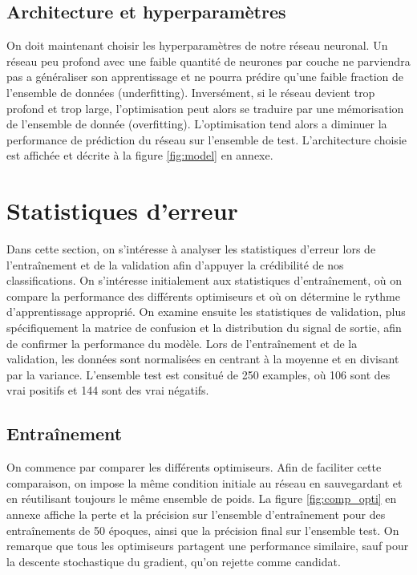 \documentclass{article}
\begin{document}
\subsection{Architecture et hyperparamètres}

On doit maintenant choisir les hyperparamètres de notre réseau neuronal. Un réseau peu profond avec une faible quantité de neurones par couche ne parviendra pas a généraliser son apprentissage et ne pourra prédire qu'une faible fraction de l'ensemble de données (underfitting). Inversément, si le réseau devient trop profond et trop large, l'optimisation peut alors se traduire par une mémorisation de l'ensemble de donnée (overfitting). L'optimisation tend alors a diminuer la performance de prédiction du réseau sur l'ensemble de test. L'architecture choisie est affichée et décrite à la figure \ref{fig:model} en annexe.

\section{Statistiques d'erreur}\label{sec:stat_err}

Dans cette section, on s'intéresse à analyser les statistiques d'erreur lors de l'entraînement et de la validation afin d'appuyer la crédibilité de nos classifications. On s'intéresse initialement aux statistiques d'entraînement, où on compare la performance des différents optimiseurs et où on détermine le rythme d'apprentissage approprié. On examine ensuite les statistiques de validation, plus spécifiquement la matrice de confusion et la distribution du signal de sortie, afin de confirmer la performance du modèle. Lors de l'entraînement et de la validation, les données sont normalisées en centrant à la moyenne et en divisant par la variance. L'ensemble test est consitué de 250 examples, où 106 sont des vrai positifs et 144 sont des vrai négatifs.

\subsection{Entraînement}

On commence par comparer les différents optimiseurs. Afin de faciliter cette comparaison, on impose la même condition initiale au réseau en sauvegardant et en réutilisant toujours le même ensemble de poids. La figure \ref{fig:comp_opti} en annexe affiche la perte et la précision sur l'ensemble d'entraînement pour des entraînements de 50 époques, ainsi que la précision final sur l'ensemble test. On remarque que tous les optimiseurs partagent une performance similaire, sauf pour la descente stochastique du gradient, qu'on rejette comme candidat.
\end{document}
